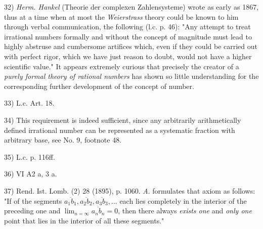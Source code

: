 \vfill
\leftline{\rule{2in}{0.4pt}}
\vspace{0.2cm}
{
\footnotesize
32) \textit{Herm. Hankel} (Theorie der complexen Zahlensysteme) wrote as early as 1867, thus at a time when at most the \textit{Weierstrass} theory could be known to him through verbal communication, the following (l.c. p. 46): "Any attempt to treat irrational numbers formally and without the concept of magnitude must lead to highly abstruse and cumbersome artifices which, even if they could be carried out with perfect rigor, which we have just reason to doubt, would not have a higher scientific value." It appears extremely curious that precisely the creator of a \textit{purely formal theory of rational numbers} has shown so little understanding for the corresponding further development of the concept of number.

33) L.c. Art. 18.

34) This requirement is indeed sufficient, since any arbitrarily arithmetically defined irrational number can be represented as a systematic fraction with arbitrary base, see No. 9, footnote 48.

35) L.c. p. 116ff.

36) VI A2 a, 3 a.

37) Rend. Ist. Lomb. (2) 28 (1895), p. 1060. \textit{A}. formulates that axiom as follows: "If of the segments $\overline{a_1b_1}, \overline{a_2b_2}, \overline{a_3b_3},...$ each lies completely in the interior of the preceding one and $\lim_{n=\infty}\overline{a_n b_n}=0$, then there always \textit{exists one} and \textit{only one} point that lies in the interior of all these segments."

}